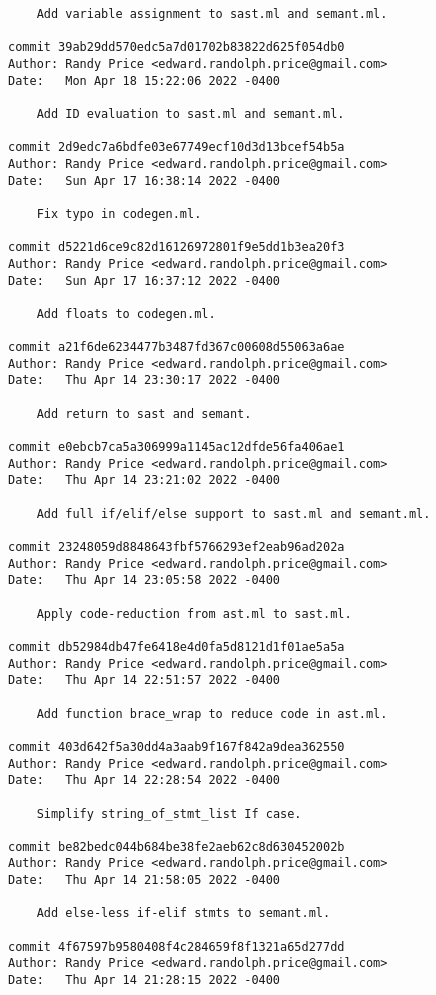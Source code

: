 {\begin{verbatim}
    Add variable assignment to sast.ml and semant.ml.

commit 39ab29dd570edc5a7d01702b83822d625f054db0
Author: Randy Price <edward.randolph.price@gmail.com>
Date:   Mon Apr 18 15:22:06 2022 -0400

    Add ID evaluation to sast.ml and semant.ml.

commit 2d9edc7a6bdfe03e67749ecf10d3d13bcef54b5a
Author: Randy Price <edward.randolph.price@gmail.com>
Date:   Sun Apr 17 16:38:14 2022 -0400

    Fix typo in codegen.ml.

commit d5221d6ce9c82d16126972801f9e5dd1b3ea20f3
Author: Randy Price <edward.randolph.price@gmail.com>
Date:   Sun Apr 17 16:37:12 2022 -0400

    Add floats to codegen.ml.

commit a21f6de6234477b3487fd367c00608d55063a6ae
Author: Randy Price <edward.randolph.price@gmail.com>
Date:   Thu Apr 14 23:30:17 2022 -0400

    Add return to sast and semant.

commit e0ebcb7ca5a306999a1145ac12dfde56fa406ae1
Author: Randy Price <edward.randolph.price@gmail.com>
Date:   Thu Apr 14 23:21:02 2022 -0400

    Add full if/elif/else support to sast.ml and semant.ml.

commit 23248059d8848643fbf5766293ef2eab96ad202a
Author: Randy Price <edward.randolph.price@gmail.com>
Date:   Thu Apr 14 23:05:58 2022 -0400

    Apply code-reduction from ast.ml to sast.ml.

commit db52984db47fe6418e4d0fa5d8121d1f01ae5a5a
Author: Randy Price <edward.randolph.price@gmail.com>
Date:   Thu Apr 14 22:51:57 2022 -0400

    Add function brace_wrap to reduce code in ast.ml.

commit 403d642f5a30dd4a3aab9f167f842a9dea362550
Author: Randy Price <edward.randolph.price@gmail.com>
Date:   Thu Apr 14 22:28:54 2022 -0400

    Simplify string_of_stmt_list If case.

commit be82bedc044b684be38fe2aeb62c8d630452002b
Author: Randy Price <edward.randolph.price@gmail.com>
Date:   Thu Apr 14 21:58:05 2022 -0400

    Add else-less if-elif stmts to semant.ml.

commit 4f67597b9580408f4c284659f8f1321a65d277dd
Author: Randy Price <edward.randolph.price@gmail.com>
Date:   Thu Apr 14 21:28:15 2022 -0400


\end{verbatim}}
